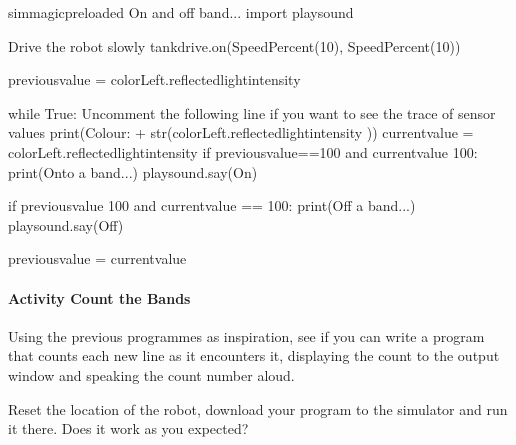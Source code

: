 \documentclass[letterpaper,10pt,english]{sphinxmanual}
\begin{document}
{
\begin{sphinxVerbatim}[commandchars=\\\{\}]
\llap{\color{nbsphinxin}[ ]:\,\hspace{\fboxrule}\hspace{\fboxsep}}\PYGZpc{}\PYGZpc{}sim\PYGZus{}magic\PYGZus{}preloaded
\PYGZsh{} On and off band...
import playsound

\PYGZsh{} Drive the robot slowly
tank\PYGZus{}drive.on(SpeedPercent(10), SpeedPercent(10))

previous\PYGZus{}value = colorLeft.reflected\PYGZus{}light\PYGZus{}intensity

while True:
    \PYGZsh{}Uncomment the following line if you want to see the trace of sensor values
    \PYGZsh{}print(\PYGZsq{}Colour: \PYGZsq{} + str(colorLeft.reflected\PYGZus{}light\PYGZus{}intensity ))
    current\PYGZus{}value = colorLeft.reflected\PYGZus{}light\PYGZus{}intensity
    if previous\PYGZus{}value==100 and current\PYGZus{}value \PYGZlt{} 100:
        print(\PYGZsq{}Onto a band...\PYGZsq{})
        playsound.say(\PYGZdq{}On\PYGZdq{})

    if previous\PYGZus{}value \PYGZlt{} 100 and current\PYGZus{}value == 100:
        print(\PYGZsq{}Off a band...\PYGZsq{})
        playsound.say(\PYGZdq{}Off\PYGZdq{})

    previous\PYGZus{}value = current\PYGZus{}value
\end{sphinxVerbatim}
}


\paragraph{Activity \sphinxhyphen{} Count the Bands}
\label{\detokenize{content/00_SOFTWARE_GUIDE/Section_00_03_quick_practical_tour:Activity---Count-the-Bands}}
Using the previous programmes as inspiration, see if you can write a program that counts each new line as it encounters it, displaying the count to the output window and speaking the count number aloud.

Reset the location of the robot, download your program to the simulator and run it there. Does it work as you expected?


\end{document}
